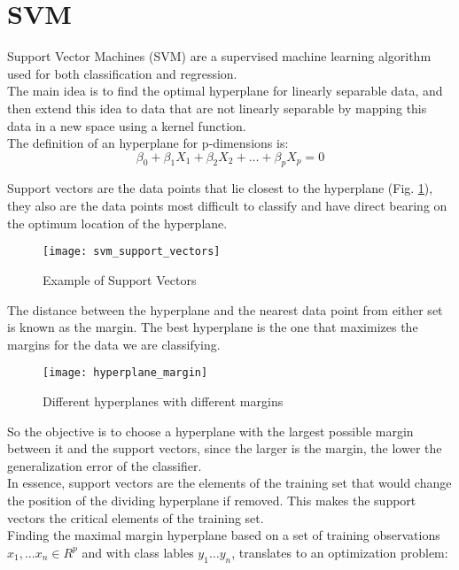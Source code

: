 \section{SVM} \label{svm}
Support Vector Machines (SVM) are a supervised machine learning algorithm used for both classification and regression. \\
The main idea is to find the optimal hyperplane for linearly separable data, and then extend this idea to data that are not linearly separable by mapping this data in a new space using a kernel function.\\
The definition of an hyperplane for p-dimensions is:
\begin{equation}
\beta_0 + \beta_1 X_1 + \beta_2 X_2 + \dots + \beta_p X_p = 0
\end{equation}

Support vectors are the data points that lie closest to the hyperplane (Fig. \ref{fig:suppvec}), they also are the data points most difficult to classify and have direct bearing on the optimum location of the hyperplane.\\
\begin{figure}[h]
	\centering
	\texttt{[image: svm\_support\_vectors]}
	\caption{Example of Support Vectors}
	\label{fig:suppvec}
\end{figure}

The distance between the hyperplane and the nearest data point from either set is known as the margin. The best hyperplane is the one that maximizes the margins for the data we are classifying.\\
\begin{figure}[H]
	\centering
	\texttt{[image: hyperplane\_margin]}
	\caption{Different hyperplanes with different margins \cite{svm_monkeylearn}}
\end{figure}

So the objective is to choose a hyperplane with the largest possible margin between it and the support vectors, since the larger is the margin, the lower the generalization error of the classifier.\\
In essence, support vectors are the elements of the training set that would change the position of the dividing hyperplane if removed. This makes the support vectors the critical elements of the training set.\\

Finding the maximal margin hyperplane based on a set of training observations $x_1, \dots x_n \in R^p$ and with class lables $y_1 \dots y_n$, translates to an optimization problem:

